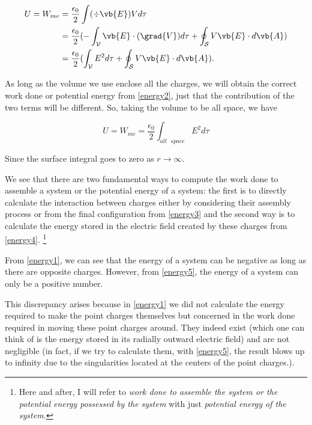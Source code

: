 \documentclass[a4paper,12pt]{report}
\begin{document}
	\begin{equation}
		\begin{aligned}
			U = W_{me} &= \frac{\epsilon_0}{2} \int (\div{\vb{E}} ) V d\tau \\ &= \frac{\epsilon_0}{2} (-\int_{\mathcal{V} } \vb{E} \cdot (\grad{V} ) d\tau + \oint_{\mathcal{S} }  V\vb{E} \cdot d\vb{A}) \\ &= \frac{\epsilon_0}{2} (\int_{\mathcal{V} }  E^2 d\tau + \oint_{\mathcal{S} }  V\vb{E} \cdot d\vb{A} ) . \label{energy4} 
		\end{aligned}
	\end{equation}
	
	As long as the volume we use enclose all the charges, we will obtain the correct work done or potential energy from \cref{energy2}, just that the contribution of the two terms will be different. So, taking the volume to be all space, we have 
	
	\begin{equation}
		U = W_{me} = \frac{\epsilon_0}{2} \int_{all \text{ } space}  E^2 d\tau \label{energy5} 
	\end{equation}
	
	Since the surface integral goes to zero as \(r \rightarrow \infty\).
	
	We see that there are two fundamental ways to compute the work done to assemble a system or the potential energy of a system: the first is to directly calculate the interaction between charges either by considering their assembly process or from the final configuration from \cref{energy3} and the second way is to calculate the energy stored in the electric field created by these charges from \cref{energy4}. \footnote{Here and after, I will refer to \emph{work done to assemble the system or the potential energy possessed by the system} with just \emph{potential energy of the system.}}
	
	From \cref{energy1}, we can see that the energy of a system can be negative as long as there are opposite charges. However, from \cref{energy5}, the energy of a system can only be a positive number. 
	
	This discrepancy arises because in \cref{energy1} we did not calculate the energy required to make the point charges themselves but concerned in the work done required in moving these point charges around. They indeed exist (which one can think of is the energy stored in its radially outward electric field) and are not negligible (in fact, if we try to calculate them, with \cref{energy5}, the result blows up to infinity due to the singularities located at the centers of the point charges.). 
	
\end{document}
